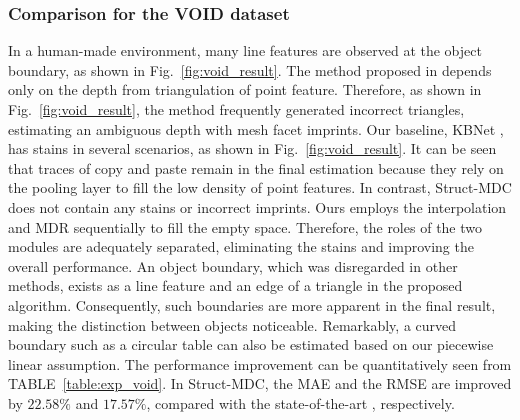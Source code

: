 \subsubsection{Comparison for the VOID dataset}
In \textcolor{color1}{a} human-made environment, many line features are observed at the object boundary\textcolor{color1}{,} as shown in Fig.~\ref{fig:void_result}.
The method proposed in \cite{void} depends only on \textcolor{color1}{the} depth from triangulation of point \textcolor{color1}{feature}. Therefore, as shown in Fig.~\ref{fig:void_result}, the method \textcolor{color1}{frequently} generated incorrect triangles, estimating an ambiguous depth with mesh facet imprints. 
Our baseline, KBNet \cite{baseline}, has stains in several \textcolor{color1}{scenarios}, as shown in Fig.~\ref{fig:void_result}. It can be \textcolor{color1}{seen} that traces of copy and paste remain in the final estimation \textcolor{color1}{because} they rely on the pooling layer to fill the low density of point features. 
In contrast, Struct-MDC does not contain any stains or incorrect imprints.
Ours employs the interpolation and MDR sequentially to fill the empty space. 
Therefore, the role\textcolor{color1}{s} of \textcolor{color1}{the two} module\textcolor{color1}{s are} adequately \textcolor{color1}{separated}, eliminating the stains and improving \textcolor{color1}{the} overall performance. 
An object boundary, which was disregarded in other methods, exists as \textcolor{color1}{a} line \textcolor{color1}{feature} and an edge of a triangle in the proposed algorithm. 
Consequently, \textcolor{color1}{such} boundaries \textcolor{color1}{are} more apparent in the final result, making the distinction between objects \textcolor{color1}{noticeable}. Remarkably, a curved boundary such as a circular table can also be estimated \textcolor{color1}{based on} our \textcolor{color1}{piecewise} linear assumption.  
The performance improvement \textcolor{color1}{can be} quantitatively \textcolor{color1}{seen from} TABLE~\ref{table:exp_void}. In Struct-MDC, the MAE and the RMSE are improved by $22.58\%$ and $17.57\%$, compared \textcolor{color1}{with} the state-of-the-art \cite{baseline}, respectively.



